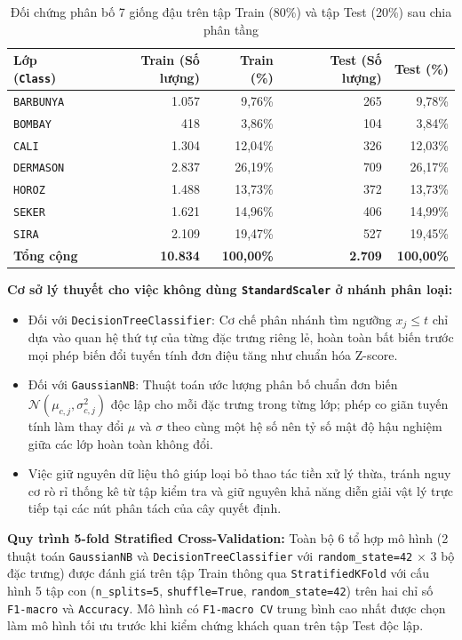 \documentclass[a4paper,12pt]{report}
\begin{document}
\begin{table}[H]
\centering
\caption{Đối chứng phân bố 7 giống đậu trên tập Train (80\%) và tập Test (20\%) sau chia phân tầng}
\label{tab:train_test_split}
\begin{tabular}{@{}lrrrr@{}}
\toprule
\textbf{Lớp (\texttt{Class})} & \textbf{Train (Số lượng)} & \textbf{Train (\%)} & \textbf{Test (Số lượng)} & \textbf{Test (\%)} \\
\midrule
\texttt{BARBUNYA} & 1.057 & 9,76\% & 265 & 9,78\% \\
\texttt{BOMBAY} & 418 & 3,86\% & 104 & 3,84\% \\
\texttt{CALI} & 1.304 & 12,04\% & 326 & 12,03\% \\
\texttt{DERMASON} & 2.837 & 26,19\% & 709 & 26,17\% \\
\texttt{HOROZ} & 1.488 & 13,73\% & 372 & 13,73\% \\
\texttt{SEKER} & 1.621 & 14,96\% & 406 & 14,99\% \\
\texttt{SIRA} & 2.109 & 19,47\% & 527 & 19,45\% \\
\midrule
\textbf{Tổng cộng} & \textbf{10.834} & \textbf{100,00\%} & \textbf{2.709} & \textbf{100,00\%} \\
\bottomrule
\end{tabular}
\end{table}

\textbf{Cơ sở lý thuyết cho việc không dùng \texttt{StandardScaler} ở nhánh phân loại:}
\begin{itemize}[leftmargin=*]
    \item Đối với \texttt{DecisionTreeClassifier}: Cơ chế phân nhánh tìm ngưỡng $x_j \le t$ chỉ dựa vào quan hệ thứ tự của từng đặc trưng riêng lẻ, hoàn toàn bất biến trước mọi phép biến đổi tuyến tính đơn điệu tăng như chuẩn hóa Z-score.
    \item Đối với \texttt{GaussianNB}: Thuật toán ước lượng phân bố chuẩn đơn biến $\mathcal{N}(\mu_{c,j}, \sigma_{c,j}^2)$ độc lập cho mỗi đặc trưng trong từng lớp; phép co giãn tuyến tính làm thay đổi $\mu$ và $\sigma$ theo cùng một hệ số nên tỷ số mật độ hậu nghiệm giữa các lớp hoàn toàn không đổi.
    \item Việc giữ nguyên dữ liệu thô giúp loại bỏ thao tác tiền xử lý thừa, tránh nguy cơ rò rỉ thống kê từ tập kiểm tra và giữ nguyên khả năng diễn giải vật lý trực tiếp tại các nút phân tách của cây quyết định.
\end{itemize}

\textbf{Quy trình 5-fold Stratified Cross-Validation:} Toàn bộ 6 tổ hợp mô hình (2 thuật toán \texttt{GaussianNB} và \texttt{DecisionTreeClassifier} với \texttt{random\_state=42} $\times$ 3 bộ đặc trưng) được đánh giá trên tập Train thông qua \texttt{StratifiedKFold} với cấu hình 5 tập con (\texttt{n\_splits=5}, \texttt{shuffle=True}, \texttt{random\_state=42}) trên hai chỉ số \texttt{F1-macro} và \texttt{Accuracy}. Mô hình có \texttt{F1-macro CV} trung bình cao nhất được chọn làm mô hình tối ưu trước khi kiểm chứng khách quan trên tập Test độc lập.
\end{document}
